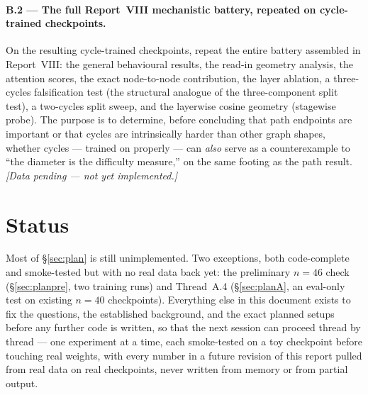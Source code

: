 \documentclass[11pt,a4paper]{article}
\begin{document}
\paragraph{B.2 --- The full Report~VIII mechanistic battery, repeated on cycle-trained
checkpoints.} On the resulting cycle-trained checkpoints, repeat the entire battery assembled in
Report~VIII: the general behavioural results, the read-in geometry analysis, the attention
scores, the exact node-to-node contribution, the layer ablation, a three-cycles falsification
test (the structural analogue of the three-component split test), a two-cycles split sweep, and
the layerwise cosine geometry (stagewise probe). The purpose is to determine, before concluding
that path endpoints are important or that cycles are intrinsically harder than other graph
shapes, whether cycles --- trained on properly --- can \emph{also} serve as a counterexample to
``the diameter is the difficulty measure,'' on the same footing as the path result.
\emph{[Data pending --- not yet implemented.]}

\section{Status}
\label{sec:status}

Most of \S\ref{sec:plan} is still unimplemented. Two exceptions, both code-complete and
smoke-tested but with no real data back yet: the preliminary $n{=}46$ check
(\S\ref{sec:planpre}, two training runs) and Thread~A.4 (\S\ref{sec:planA}, an eval-only test on
existing $n{=}40$ checkpoints). Everything else in this document exists to fix the questions,
the established background, and the exact planned setups before any further code is written, so
that the next session can proceed thread by thread --- one experiment at a time, each
smoke-tested on a toy checkpoint before touching real weights, with every number in a future
revision of this report pulled from real data on real checkpoints, never written from memory or
from partial output.
\end{document}
